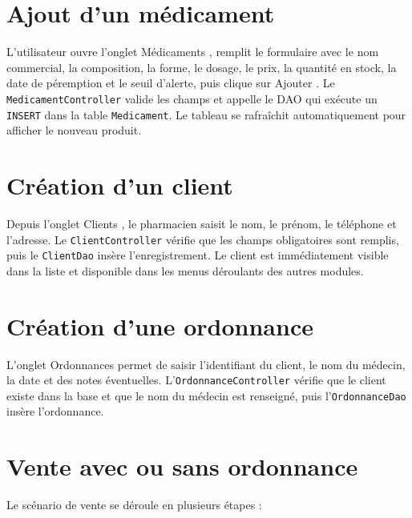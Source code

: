 \documentclass[12pt,a4paper]{report}
\begin{document}
\section{Ajout d'un médicament}

L'utilisateur ouvre l'onglet \og Médicaments \fg, remplit le formulaire avec le nom commercial, la composition, la forme, le dosage, le prix, la quantité en stock, la date de péremption et le seuil d'alerte, puis clique sur \og Ajouter \fg. Le \texttt{MedicamentController} valide les champs et appelle le DAO qui exécute un \texttt{INSERT} dans la table \texttt{Medicament}. Le tableau se rafraîchit automatiquement pour afficher le nouveau produit.

\section{Création d'un client}

Depuis l'onglet \og Clients \fg, le pharmacien saisit le nom, le prénom, le téléphone et l'adresse. Le \texttt{ClientController} vérifie que les champs obligatoires sont remplis, puis le \texttt{ClientDao} insère l'enregistrement. Le client est immédiatement visible dans la liste et disponible dans les menus déroulants des autres modules.

\section{Création d'une ordonnance}

L'onglet \og Ordonnances \fg{} permet de saisir l'identifiant du client, le nom du médecin, la date et des notes éventuelles. L'\texttt{OrdonnanceController} vérifie que le client existe dans la base et que le nom du médecin est renseigné, puis l'\texttt{OrdonnanceDao} insère l'ordonnance.

\section{Vente avec ou sans ordonnance}

Le scénario de vente se déroule en plusieurs étapes :
\end{document}
